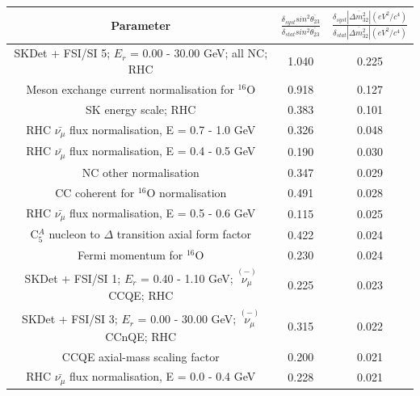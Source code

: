 \begin{table}
\small
\centering
\begin{tabular}{| c | c | c |}
\hline
 Parameter               &  $\frac{\delta_{syst} sin^2\overline{\theta_{23}}}{\delta_{stat} sin^2\overline{\theta_{23}}}$   &  $\frac{\delta_{syst}|\overline{\Delta m^2_{32}}| (eV^{2}/c^{4})}{\delta_{stat} |\overline{\Delta m^2_{32}}| (eV^{2}/c^{4})}$ \\
\hline
                                      SKDet + FSI/SI  5; $E_r$ =  0.00 - 30.00 GeV; all NC; RHC & 1.040 & 0.225 \\ \hline 
                                              Meson exchange current normalisation for $^{16}$O & 0.918 & 0.127 \\ \hline 
                                                                           SK energy scale; RHC & 0.383 & 0.101 \\ \hline 
                                      RHC $\bar{\nu_\mu}$ flux normalisation, E = 0.7 - 1.0 GeV & 0.326 & 0.048 \\ \hline 
                                      RHC $\bar{\nu_\mu}$ flux normalisation, E = 0.4 - 0.5 GeV & 0.190 & 0.030 \\ \hline 
                                                                         NC other normalisation & 0.347 & 0.029 \\ \hline 
                                                         CC coherent for $^{16}$O normalisation & 0.491 & 0.028 \\ \hline 
                                      RHC $\bar{\nu_\mu}$ flux normalisation, E = 0.5 - 0.6 GeV & 0.115 & 0.025 \\ \hline 
                                   C$^{A}_{5}$ nucleon to $\Delta$ transition axial form factor & 0.422 & 0.024 \\ \hline 
                                                                    Fermi momentum for $^{16}$O & 0.230 & 0.024 \\ \hline 
                SKDet + FSI/SI  1; $E_r$ =  0.40 - 1.10 GeV; $\overset{(-)}{\nu_\mu}$ CCQE; RHC & 0.225 & 0.023 \\ \hline 
              SKDet + FSI/SI  3; $E_r$ =  0.00 - 30.00 GeV; $\overset{(-)}{\nu_\mu}$ CCnQE; RHC & 0.315 & 0.022 \\ \hline 
                                                                 CCQE axial-mass scaling factor & 0.200 & 0.021 \\ \hline 
                                      RHC $\bar{\nu_\mu}$ flux normalisation, E = 0.0 - 0.4 GeV & 0.228 & 0.021 \\ \hline 

\end{tabular}
\end{table}
